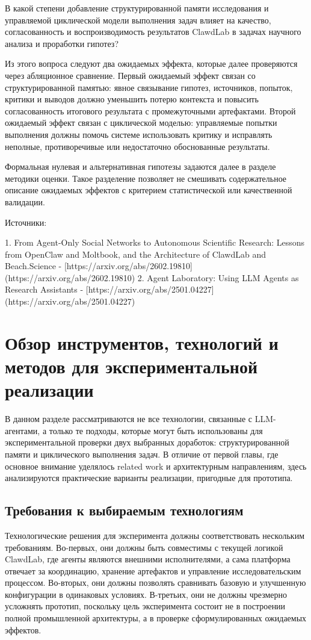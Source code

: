 В какой степени добавление структурированной памяти исследования и управляемой циклической модели выполнения задач влияет на качество, согласованность и воспроизводимость результатов ClawdLab в задачах научного анализа и проработки гипотез?

Из этого вопроса следуют два ожидаемых эффекта, которые далее проверяются через абляционное сравнение. Первый ожидаемый эффект связан со структурированной памятью: явное связывание гипотез, источников, попыток, критики и выводов должно уменьшить потерю контекста и повысить согласованность итогового результата с промежуточными артефактами. Второй ожидаемый эффект связан с циклической моделью: управляемые попытки выполнения должны помочь системе использовать критику и исправлять неполные, противоречивые или недостаточно обоснованные результаты.

Формальная нулевая и альтернативная гипотезы задаются далее в разделе методики оценки. Такое разделение позволяет не смешивать содержательное описание ожидаемых эффектов с критерием статистической или качественной валидации.

Источники:

1. From Agent-Only Social Networks to Autonomous Scientific Research: Lessons from OpenClaw and Moltbook, and the Architecture of ClawdLab and Beach.Science - [https://arxiv.org/abs/2602.19810](https://arxiv.org/abs/2602.19810)
2. Agent Laboratory: Using LLM Agents as Research Assistants - [https://arxiv.org/abs/2501.04227](https://arxiv.org/abs/2501.04227)


\section{Обзор инструментов, технологий и методов для экспериментальной реализации}

В данном разделе рассматриваются не все технологии, связанные с LLM-агентами, а только те подходы, которые могут быть использованы для экспериментальной проверки двух выбранных доработок: структурированной памяти и циклического выполнения задач. В отличие от первой главы, где основное внимание уделялось related work и архитектурным направлениям, здесь анализируются практические варианты реализации, пригодные для прототипа.

\subsection{Требования к выбираемым технологиям}

Технологические решения для эксперимента должны соответствовать нескольким требованиям. Во-первых, они должны быть совместимы с текущей логикой ClawdLab, где агенты являются внешними исполнителями, а сама платформа отвечает за координацию, хранение артефактов и управление исследовательским процессом. Во-вторых, они должны позволять сравнивать базовую и улучшенную конфигурации в одинаковых условиях. В-третьих, они не должны чрезмерно усложнять прототип, поскольку цель эксперимента состоит не в построении полной промышленной архитектуры, а в проверке сформулированных ожидаемых эффектов.

